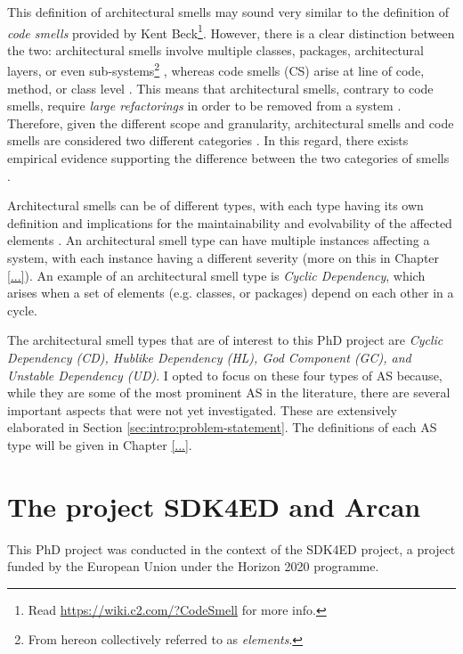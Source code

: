 This definition of architectural smells may sound very similar to the definition of \emph{code smells} provided by Kent Beck\footnote{Read \url{https://wiki.c2.com/?CodeSmell} for more info.}. 
However, there is a clear distinction between the two: architectural smells involve multiple classes, packages, architectural layers, or even sub-systems\footnote{From hereon collectively referred to as \emph{elements}.} \cite{Lippert2006}, whereas code smells (CS) arise at line of code, method, or class level \cite{Fowler2002}. 
This means that architectural smells, contrary to code smells, require \emph{large refactorings} in order to be removed from a system \cite{Lippert2006}.
Therefore, given the different scope and granularity, architectural smells and code smells are considered two different categories \cite{Sharma2020}.
In this regard, there exists empirical evidence supporting the difference between the two categories of smells \cite{Arcelli2019}.

Architectural smells can be of different types, with each type having its own definition and implications for the maintainability and evolvability of the affected elements \cite{Azadi2019}.
An architectural smell type can have multiple instances affecting a system, with each instance having a different severity (more on this in Chapter \ref{...}).
An example of an architectural smell type is \emph{Cyclic Dependency}, which arises when a set of elements (e.g. classes, or packages) depend on each other in a cycle.

The architectural smell types that are of interest to this PhD project are \emph{Cyclic Dependency (CD), Hublike Dependency (HL), God Component (GC), and Unstable Dependency (UD)}.
I opted to focus on these four types of AS because, while they are some of the most prominent AS in the literature, there are several important aspects that were not yet investigated. These are extensively elaborated in Section \ref{sec:intro:problem-statement}.
The definitions of each AS type will be given in Chapter \ref{...}.


\section{The project SDK4ED and Arcan}
This PhD project was conducted in the context of the SDK4ED project, a project funded by the European Union under the Horizon 2020 programme.

